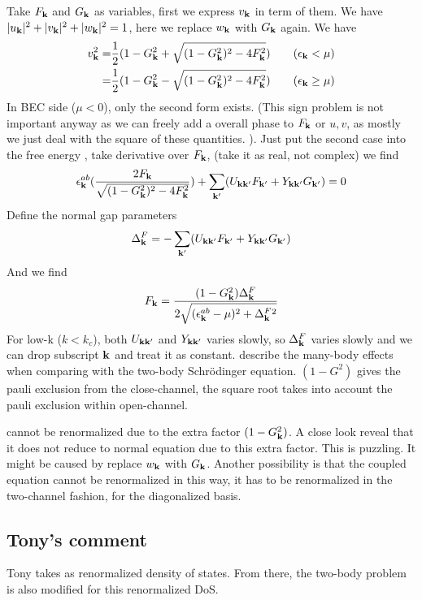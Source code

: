 Take $F_{\mathbf{k}}$ and $G_{\mathbf{k}}$ as variables, first we express $v_{\mathbf{k}}$ in term of them.  We have  $\lvert{u_{\ensuremath{\mathbf{k}}}}\rvert^2+\lvert{v_{\ensuremath{\mathbf{k}}}}\rvert^2+\lvert{w_{\ensuremath{\mathbf{k}}}}\rvert^2=1$, here we replace  $w_{\mathbf{k}}$  with  $G_{\mathbf{k}}$  again.  We have 
\[
\begin{split}
v_{\mathbf{k}}^2=&\frac{1}{2}(1-G_{\mathbf{k}}^{2}+\sqrt{(1-G_{\mathbf{k}}^{2})^{2}-4F_{\mathbf{k}}^{2}})\qquad (\epsilon_{\mathbf{k}}<\mu)\\
	=&\frac{1}{2}(1-G_{\mathbf{k}}^{2}-\sqrt{(1-G_{\mathbf{k}}^{2})^{2}-4F_{\mathbf{k}}^{2}})\qquad (\epsilon_{\mathbf{k}}\geq\mu)
\end{split}
\]
In BEC side ($\mu<0$), only the second form exists. (This sign problem is not important anyway as we can freely add a overall phase to $F_{\mathbf{k}}$ or $u,v$, as mostly we just deal with the square of these quantities. ).   Just put the second case into the free energy , take derivative over $F_{\mathbf{k}}$, (take it as real, not complex) we find 
\begin{equation}\label{eq:20100909:fEq}
\epsilon^{ab}_{\mathbf{k}}(\frac{2F_{\mathbf{k}}}{\sqrt{(1-G_{\mathbf{k}}^{2})^{2}-4F_{\mathbf{k}}^{2}}})+\sum_{\mathbf{k}'}(U_{\mathbf{k}\mathbf{k}'}F_{\mathbf{k}'}+Y_{\mathbf{k}\mathbf{k}'}G_{\mathbf{k}'})=0
\end{equation}
Define the normal gap parameters 
\begin{equation}\label{eq:20100909:gap}
\Delta^{F}_{\mathbf{k}}=-\sum_{\mathbf{k}'}(U_{\mathbf{k}\mathbf{k}'}F_{\mathbf{k}'}+Y_{\mathbf{k}\mathbf{k}'}G_{\mathbf{k}'})
\end{equation}
And we find
\begin{equation}
F_{\mathbf{k}}=\frac{(1-G_{\mathbf{k}}^{2})\Delta^{F}_{\mathbf{k}}}{2\sqrt{(\epsilon^{ab}_{\mathbf{k}}-\mu)^{2}+\Delta^{F}_{\mathbf{k}}{}^{2}}}
\end{equation}
For low-k ($k<k_{c}$), both $U_{\mathbf{k}\mathbf{k}'}$ and $Y_{\mathbf{k}\mathbf{k}'}$ varies slowly, so $\Delta^{F}_{\mathbf{k}}$ varies slowly and we can drop subscript $\mathbf{k}$ and treat it as constant.   describe the many-body effects when comparing with the two-body Schr\"{o}dinger equation.  $(1-G^{2})$ gives the pauli exclusion from the close-channel, the square root takes into account the pauli exclusion within open-channel.  

 cannot be renormalized due to the extra factor $(1-G_{\mathbf{k}}^{2})$.  A close look reveal that it does not reduce to normal \sch equation due to this extra factor.  This is puzzling.  It might be caused by replace $w_{\mathbf{k}}$ with $G_{\mathbf{k}}$.  Another possibility is that the coupled equation cannot be renormalized in this way, it has to be renormalized in the two-channel fashion, for the diagonalized  basis.  

\subsection{Tony's comment}
Tony takes  as renormalized density of states.  From there, the two-body problem is also modified for this renormalized DoS. 

